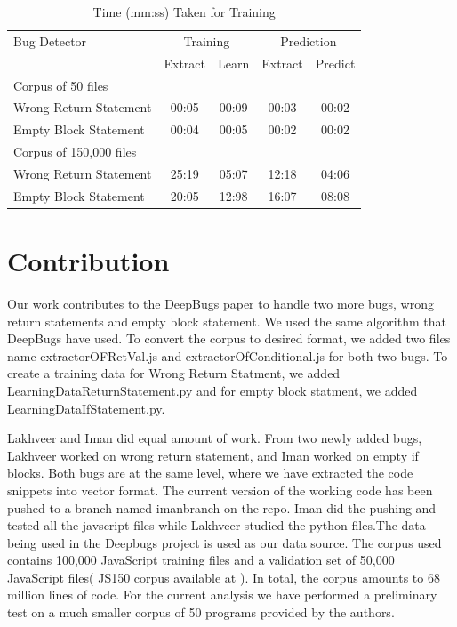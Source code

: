 \documentclass[sigconf]{acmart}
\begin{document}
\begin{table}[h!]
\begin{tabular}{l cc | cc}
\toprule
Bug Detector & \multicolumn{2}{c}{Training} & \multicolumn{2}{c}{Prediction} \\
\cline{2-5}
 & Extract & Learn & Extract & Predict \\
\midrule
\hline
Corpus of 50 files & & & \\
\cline{1-1}
Wrong Return Statement  & 00:05 & 00:09 & 00:03 & 00:02 \\
Empty Block Statement & 00:04 & 00:05 & 00:02 & 00:02 \\
\hline
Corpus of 150,000 files & & & \\
\cline{1-1}
Wrong Return Statement  & 25:19 & 05:07 & 12:18 & 04:06 \\
Empty Block Statement & 20:05 & 12:98 & 16:07 & 08:08 \\
\bottomrule
\end{tabular}
\caption{Time (mm:ss) Taken for Training}
\label{tab: time_table}
\end{table} 


\section{Contribution}
Our work contributes to the DeepBugs paper to handle two more bugs, wrong return statements and empty block statement. We used the same algorithm that DeepBugs have used. To convert the corpus to desired format, we added two files name extractorOFRetVal.js and extractorOfConditional.js for both two bugs. To create a training data for Wrong Return Statment, we added LearningDataReturnStatement.py and for empty block statment, we added LearningDataIfStatement.py.   

Lakhveer and Iman did equal amount of work. From two newly added bugs, Lakhveer worked on wrong return statement, and Iman worked on empty if blocks. Both bugs are at the same level, where we have extracted the code snippets into vector format.
The current version of the working code has been pushed to a branch named imanbranch on the repo. Iman did the pushing and tested all the javscript files while Lakhveer studied the python files.The data being used in the Deepbugs project is used as our data source. The corpus used contains 100,000 JavaScript training files and a validation set of 50,000 JavaScript files( JS150 corpus available at ). In total, the corpus amounts to 68 million lines of code. For the current analysis we have performed a preliminary test on a much smaller corpus of  50 programs provided by the authors.
\end{document}

